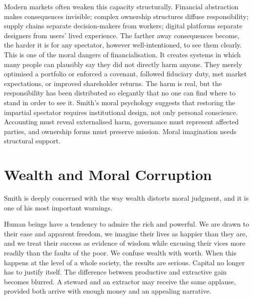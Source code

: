 \documentclass[11pt,a4paper,oneside]{book}
\begin{document}
Modern markets often weaken this capacity structurally. Financial abstraction makes consequences invisible; complex ownership structures diffuse responsibility; supply chains separate decision-makers from workers; digital platforms separate designers from users' lived experience. The farther away consequences become, the harder it is for any spectator, however well-intentioned, to see them clearly. This is one of the moral dangers of financialisation. It creates systems in which many people can plausibly say they did not directly harm anyone. They merely optimised a portfolio or enforced a covenant, followed fiduciary duty, met market expectations, or improved shareholder returns. The harm is real, but the responsibility has been distributed so elegantly that no one can find where to stand in order to see it. Smith's moral psychology suggests that restoring the impartial spectator requires institutional design, not only personal conscience. Accounting must reveal externalised harm, governance must represent affected parties, and ownership forms must preserve mission. Moral imagination needs structural support.

\section*{Wealth and Moral Corruption}

Smith is deeply concerned with the way wealth distorts moral judgment, and it is one of his most important warnings.

Human beings have a tendency to admire the rich and powerful. We are drawn to their ease and apparent freedom, we imagine their lives as happier than they are, and we treat their success as evidence of wisdom while excusing their vices more readily than the faults of the poor. We confuse wealth with worth. When this happens at the level of a whole society, the results are serious. Capital no longer has to justify itself. The difference between productive and extractive gain becomes blurred. A steward and an extractor may receive the same applause, provided both arrive with enough money and an appealing narrative.
\end{document}
